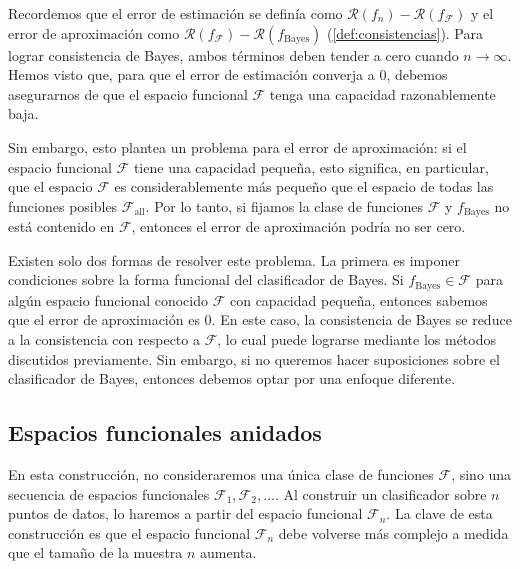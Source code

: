 \documentclass{report}
\begin{document}
Recordemos que el error de estimación se definía como \(\mathcal{R}(f_n) - \mathcal{R}(f_{\mathcal{F}})\) 
y el error de aproximación como \(\mathcal{R}(f_{\mathcal{F}}) - \mathcal{R}(f_{\text{Bayes}})\) 
(\ref{def:consistencias}). Para lograr consistencia de Bayes, ambos términos deben tender a cero cuando 
\(n \to \infty\). Hemos visto que, para que el error de estimación converja a \(0\), debemos 
asegurarnos de que el espacio funcional \(\mathcal{F}\) tenga una capacidad razonablemente baja.\newline

Sin embargo, esto plantea un problema para el error de aproximación: si el espacio funcional 
\(\mathcal{F}\) tiene una capacidad pequeña, esto significa, en particular, que el espacio 
\(\mathcal{F}\) es considerablemente más pequeño que el espacio de todas las funciones posibles 
\(\mathcal{F}_{\text{all}}\). Por lo tanto, si fijamos la clase de funciones \(\mathcal{F}\) y 
\(f_{\text{Bayes}}\) no está contenido en \(\mathcal{F}\), entonces el 
error de aproximación podría no ser cero.\newline

Existen solo dos formas de resolver este problema. La primera es imponer condiciones sobre la 
forma funcional del clasificador de Bayes. Si \(f_{\text{Bayes}} \in \mathcal{F}\) para algún 
espacio funcional conocido \(\mathcal{F}\) con capacidad pequeña, entonces sabemos que el error 
de aproximación es \(0\). En este caso, la consistencia de Bayes se reduce a la consistencia con 
respecto a \(\mathcal{F}\), lo cual puede lograrse mediante los métodos discutidos previamente. 
Sin embargo, si no queremos hacer suposiciones sobre el clasificador de Bayes, entonces 
debemos optar por una enfoque diferente.\newline

\subsection{Espacios funcionales anidados}

En esta construcción, no consideraremos una única clase de funciones \(\mathcal{F}\), sino una 
secuencia de espacios funcionales \(\mathcal{F}_1, \mathcal{F}_2, \dots\). Al construir un 
clasificador sobre \(n\) puntos de datos, lo haremos a partir del espacio funcional \(\mathcal{F}_n\). 
La clave de esta construcción es que el espacio funcional \(\mathcal{F}_n\) debe volverse más 
complejo a medida que el tamaño de la muestra \(n\) aumenta.\newline
\end{document}
